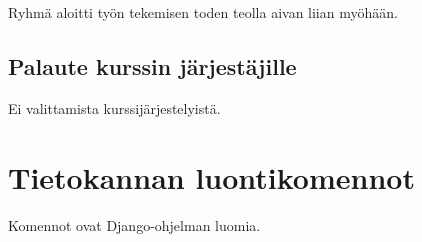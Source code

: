 \documentclass[a4paper,twoside,titlepage,12pt]{article}
\begin{document}
Ryhmä aloitti työn tekemisen toden teolla aivan liian myöhään.

\subsection{Palaute kurssin järjestäjille}

Ei valittamista kurssijärjestelyistä.

%
%
%
\newpage
\section*{Tietokannan luontikomennot}

Komennot ovat Django-ohjelman luomia.


\end{document}
